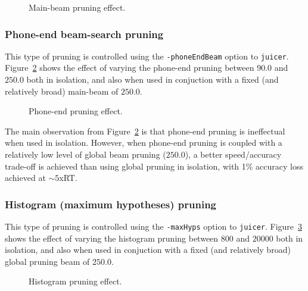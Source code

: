 \documentclass[a4paper,12pt]{report}
\begin{document}
\begin{figure}
\begin{center}
\caption{Main-beam pruning effect.}
\label{fig:mainbeamgraph}
\end{center}
\end{figure}


\subsubsection{Phone-end beam-search pruning}

This type of pruning is controlled using the {\tt -phoneEndBeam} option to {\tt juicer}. Figure~\ref{fig:phoneendbeamgraph} shows the effect of varying the phone-end pruning between $90.0$ and $250.0$ both in isolation, and also when used in conjuction with a fixed (and relatively broad) main-beam of $250.0$.

\begin{figure}
\begin{center}
\caption{Phone-end pruning effect.}
\label{fig:phoneendbeamgraph}
\end{center}
\end{figure}

The main observation from Figure~\ref{fig:phoneendbeamgraph} is that phone-end pruning is ineffectual when used in isolation. However, when phone-end pruning is coupled with a relatively low level of global beam pruning ($250.0$), a better speed/accuracy trade-off is achieved than using global pruning in isolation, with 1\% accuracy loss achieved at $\sim5$xRT.


\subsubsection{Histogram (maximum hypotheses) pruning}

This type of pruning is controlled using the {\tt -maxHyps} option to {\tt juicer}. Figure~\ref{fig:histogramgraph} shows the effect of varying the histogram pruning between $800$ and $20000$ both in isolation, and also when used in conjuction with a fixed (and relatively broad) global pruning beam of $250.0$.

\begin{figure}
\begin{center}
\caption{Histogram pruning effect.}
\label{fig:histogramgraph}
\end{center}
\end{figure}
\end{document}
